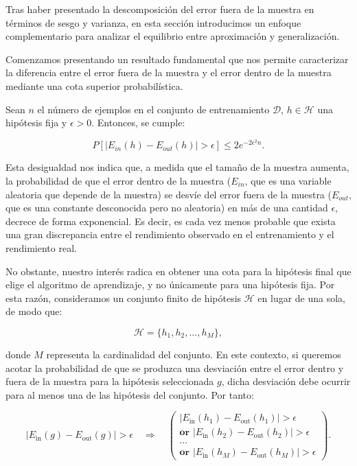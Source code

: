 Tras haber presentado la descomposición del error fuera de la muestra en términos de sesgo y varianza, en esta sección introducimos un enfoque complementario para analizar el equilibrio entre aproximación y generalización.

Comenzamos presentando un resultado fundamental que nos permite caracterizar la diferencia entre el error fuera de la muestra y el error dentro de la muestra mediante una cota superior probabilística.

\begin{definicion}
    Sean $n$ el número de ejemplos en el conjunto de entrenamiento $\mathcal{D}$, $h \in \mathcal{H}$ una hipótesis fija y $\epsilon > 0$. Entonces, se cumple:

    \[
        P\left[ \left| E_{in}(h) - E_{out}(h) \right| > \epsilon \right] \leq 2 e^{-2\epsilon^2 n}.
    \]
\end{definicion}

Esta desigualdad nos indica que, a medida que el tamaño de la muestra aumenta, la probabilidad de que el error dentro de la muestra ($E_{in}$, que es una variable aleatoria que depende de la muestra) se desvíe del error fuera de la muestra ($E_{out}$, que es una constante desconocida pero no aleatoria) en más de una cantidad $\epsilon$, decrece de forma exponencial. Es decir, es cada vez menos probable que exista una gran discrepancia entre el rendimiento observado en el entrenamiento y el rendimiento real.

No obstante, nuestro interés radica en obtener una cota para la hipótesis final que elige el algoritmo de aprendizaje, y no únicamente para una hipótesis fija. Por esta razón, consideramos un conjunto finito de hipótesis $\mathcal{H}$ en lugar de una sola, de modo que:

\[
    \mathcal{H} = \{h_1, h_2, \ldots, h_M\},
\]

donde $M$ representa la cardinalidad del conjunto. En este contexto, si queremos acotar la probabilidad de que se produzca una desviación entre el error dentro y fuera de la muestra para la hipótesis seleccionada $g$, dicha desviación debe ocurrir para al menos una de las hipótesis del conjunto. Por tanto:

\[
    \left| E_{\text{in}}(g) - E_{\text{out}}(g) \right| > \epsilon 
    \quad \Rightarrow \quad
    \left(
    \begin{array}{l}
    \left| E_{\text{in}}(h_1) - E_{\text{out}}(h_1) \right| > \epsilon \\
    \textbf{or } \left| E_{\text{in}}(h_2) - E_{\text{out}}(h_2) \right| > \epsilon \\
    \ldots \\
    \textbf{or } \left| E_{\text{in}}(h_M) - E_{\text{out}}(h_M) \right| > \epsilon
    \end{array}
    \right).
\]

